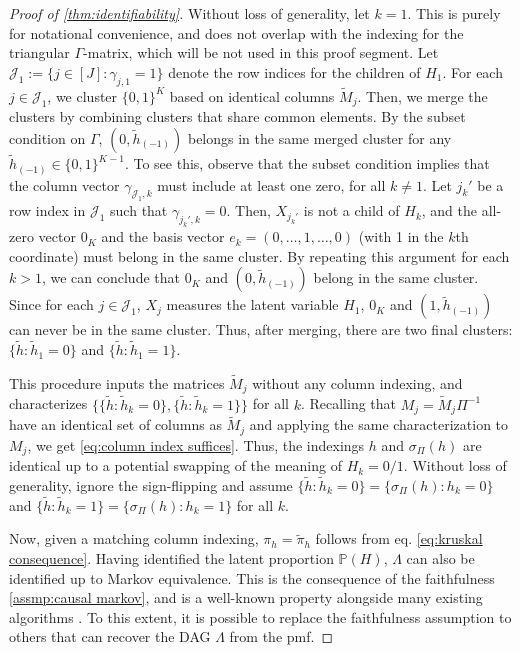 \documentclass[10pt]{article} %
\newcommand{\PP}{\mathbb P}
\def\tilde{\widetilde}
\begin{document}
\begin{proof}[Proof of \cref{thm:identifiability}]
Without loss of generality, let $k=1$. This is purely for notational convenience, and does not overlap with the indexing for the triangular $\Gamma$-matrix, which will be not used in this proof segment. 
Let $\mathcal{J}_1 := \{j \in [J]: \gamma_{j,1} = 1\}$ denote the row indices for the children of $H_1$.
For each $j \in \mathcal{J}_1$, we cluster $\{0,1\}^K$ based on identical columns $\tilde{M}_j$. Then, we merge the clusters by combining clusters that share common elements. By the subset condition on $\Gamma$, $(0, \tilde{h}_{(-1)})$ belongs in the same merged cluster for any $\tilde{h}_{(-1)} \in \{0,1\}^{K-1}$. To see this, observe that the subset condition implies that the column vector $\gamma_{\mathcal{J}_1, k}$ must include at least one zero, for all $k \neq 1$. Let $j_k'$ be a row index in $\mathcal{J}_1$ such that $\gamma_{j_k',k} = 0$. Then, $X_{j_k'}$ is not a child of $H_k$, and the all-zero vector $0_K$ and the basis vector $e_k = (0, \ldots, 1, \ldots, 0)$ (with 1 in the $k$th coordinate) must belong in the same cluster. By repeating this argument for each $k > 1$, we can conclude that $0_K$ and $(0, \tilde{h}_{(-1)})$ belong in the same cluster. Since for each $j \in \mathcal{J}_1$, $X_j$ measures the latent variable $H_1$, $0_K$ and $(1, \tilde{h}_{(-1)})$ can never be in the same cluster. 
Thus, after merging, there are two final clusters: $\{\tilde{h} : \tilde{h}_1 = 0\}$ and $\{\tilde{h}: \tilde{h}_1 = 1\}$.

This procedure inputs the matrices $\tilde{M}_j$ without any column indexing, and characterizes $\{\{\tilde{h} : \tilde{h}_k = 0\}, \{\tilde{h}: \tilde{h}_k = 1\}\}$ for all $k$. Recalling that $M_j = \tilde{M}_j \Pi^{-1} $ have an identical set of columns as $\tilde{M}_j$ and applying the same characterization to $M_j$, we get \eqref{eq:column index suffices}. Thus, the indexings $h$ and $\sigma_\Pi(h)$ are identical up to a potential swapping of the meaning of $H_k = 0/1$. Without loss of generality, ignore the sign-flipping and assume $\{\tilde{h}: \tilde{h}_k = 0\} = \{\sigma_\Pi({h}): {h}_k = 0\}$ and $\{\tilde{h}: \tilde{h}_k = 1\} = \{\sigma_\Pi({h}): {h}_k = 1\}$ for all $k$.
%

Now, given a matching column indexing, $\pi_h = \tilde{\pi}_h$ follows from eq. \eqref{eq:kruskal consequence}. Having identified the latent proportion $\PP(H)$, $\Lambda$ can also be identified up to Markov equivalence. This is the consequence of the faithfulness \cref{assmp:causal markov}, and is a well-known property alongside many existing algorithms \citep{pearl2014probabilistic, spirtes2001causation}. To this extent, it is possible to replace the faithfulness assumption to others that can recover the DAG $\Lambda$ from the pmf.


\end{proof}
\end{document}
